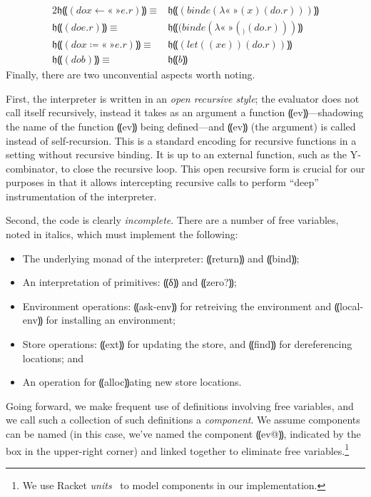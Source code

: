 \begin{alignat*}{2}
   𝔥⸨(do x ←«\ »e . r)⸩ ≡ &\mathrel{} 𝔥⸨(bind e (λ«\ »(x) (do . r)))⸩
\\        𝔥⸨(do e . r)⸩ ≡ &\mathrel{} 𝔥⸨(bind e (λ«\ »(_) (do . r)))⸩
\\ 𝔥⸨(do x ≔«\ »e . r)⸩ ≡ &\mathrel{} 𝔥⸨(let ((x e)) (do . r))⸩
\\            𝔥⸨(do b)⸩ ≡ &\mathrel{} 𝔥⸨b⸩
\end{alignat*}
Finally, there are two unconvential aspects worth noting.

First, the interpreter is written in an \emph{open recursive style}; the
evaluator does not call itself recursively, instead it takes as an argument a
function ⸨ev⸩—shadowing the name of the function ⸨ev⸩ being defined—and ⸨ev⸩
(the argument) is called instead of self-recursion.  This is a standard
encoding for recursive functions in a setting without recursive binding.  It is
up to an external function, such as the Y-combinator, to close the recursive
loop.  This open recursive form is crucial for our purposes in that it allows
intercepting recursive calls to perform “deep” instrumentation of the
interpreter.

Second, the code is clearly \emph{incomplete}.  There are a number of free
variables, noted in italics, which must implement the following:
\begin{itemize}
\item The underlying monad of the interpreter: ⸨return⸩ and ⸨bind⸩;
\item An interpretation of primitives: ⸨δ⸩ and ⸨zero?⸩;
\item Environment operations: ⸨ask-env⸩ for retreiving the
environment and ⸨local-env⸩ for installing an environment;
\item Store operations: ⸨ext⸩ for updating the store, and ⸨find⸩ for
dereferencing locations; and
\item An operation for ⸨alloc⸩ating new store locations.
\end{itemize}
Going forward, we make frequent use of definitions involving free variables,
and we call such a collection of such definitions a \emph{component}. We assume
components can be named (in this case, we've named the component ⸨ev@⸩,
indicated by the box in the upper-right corner) and linked together to
eliminate free variables.\footnote{We use Racket
\emph{units}~\cite{local:flatt-pldi98} to model components in our
implementation.}


